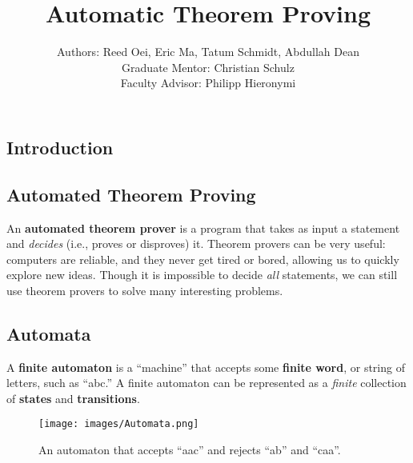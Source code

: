 \documentclass[landscape,usenames,dvipsnames]{sciposter}
\title{Automatic Theorem Proving}
\author{
Authors: Reed Oei, Eric Ma, Tatum Schmidt, Abdullah Dean \\
Graduate Mentor: Christian Schulz \\
Faculty Advisor: Philipp Hieronymi \\
}
\begin{document}

\maketitle
\vspace{-3ex}
\begin{multicols}{3}  %



\section*{Introduction}
\begin{mdframed}[style=MyFrame]
\subsection*{Automated Theorem Proving}
\end{mdframed}

An \textbf{automated theorem prover} is a program that takes as input a statement and \emph{decides} (i.e., proves or disproves) it. 
Theorem provers can be very useful: computers are reliable, and they never get tired or bored, allowing us to quickly explore new ideas.
Though it is impossible to decide \emph{all} statements, we can still use theorem provers to solve many interesting problems. 

\begin{mdframed}[style=MyFrame]
\subsection*{Automata}
\end{mdframed}
A \textbf{finite automaton} is a ``machine'' that accepts some \textbf{finite word}, or string of letters, such as ``abc.'' A finite automaton can be represented as a \emph{finite} collection of \textbf{states} and \textbf{transitions}.

\vspace{-15mm}
\begin{figure}
    \centering
    \texttt{[image: images/Automata.png]}
    \caption{An automaton that accepts ``aac'' and rejects ``ab'' and ``caa''.}
    \label{fig:aut_example}
\end{figure}
\vspace{-20mm}



\end{multicols}
\end{document}
